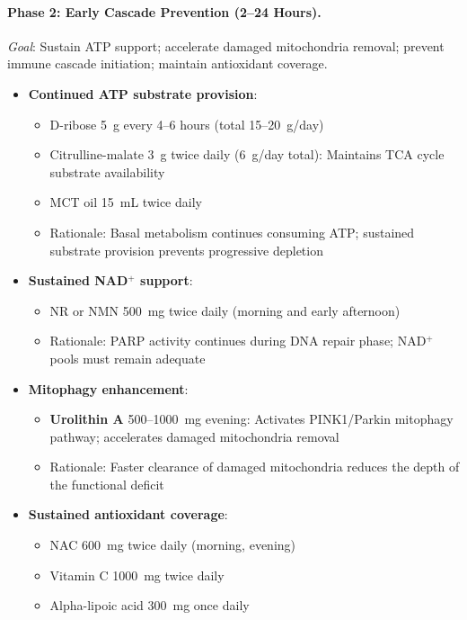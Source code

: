 \paragraph{Phase 2: Early Cascade Prevention (2--24 Hours).}

\textit{Goal}: Sustain ATP support; accelerate damaged mitochondria removal; prevent immune cascade initiation; maintain antioxidant coverage.

\begin{itemize}
    \item \textbf{Continued ATP substrate provision}:
    \begin{itemize}
        \item D-ribose 5~g every 4--6 hours (total 15--20~g/day)
        \item Citrulline-malate 3~g twice daily (6~g/day total): Maintains TCA cycle substrate availability
        \item MCT oil 15~mL twice daily
        \item Rationale: Basal metabolism continues consuming ATP; sustained substrate provision prevents progressive depletion
    \end{itemize}

    \item \textbf{Sustained NAD$^+$ support}:
    \begin{itemize}
        \item NR or NMN 500~mg twice daily (morning and early afternoon)
        \item Rationale: PARP activity continues during DNA repair phase; NAD$^+$ pools must remain adequate
    \end{itemize}

    \item \textbf{Mitophagy enhancement}:
    \begin{itemize}
        \item \textbf{Urolithin A} 500--1000~mg evening: Activates PINK1/Parkin mitophagy pathway; accelerates damaged mitochondria removal
        \item Rationale: Faster clearance of damaged mitochondria reduces the depth of the functional deficit
    \end{itemize}

    \item \textbf{Sustained antioxidant coverage}:
    \begin{itemize}
        \item NAC 600~mg twice daily (morning, evening)
        \item Vitamin C 1000~mg twice daily
        \item Alpha-lipoic acid 300~mg once daily
    \end{itemize}


\end{itemize}
